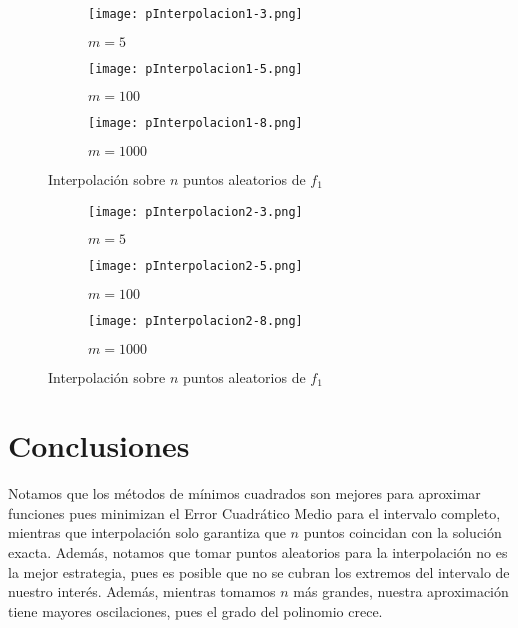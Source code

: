 \begin{figure}[H]
\centering
\begin{subfigure}[b]{0.3\textwidth}
	\centering
	\texttt{[image: pInterpolacion1-3.png]}
	\caption{$m=5$}
\end{subfigure}
\hfill
\begin{subfigure}[b]{0.3\textwidth}
	\centering
	\texttt{[image: pInterpolacion1-5.png]}
	\caption{$m=100$}
\end{subfigure}
\hfill
\begin{subfigure}[b]{0.3\textwidth}
	\centering
	\texttt{[image: pInterpolacion1-8.png]}
	\caption{$m=1000$}
\end{subfigure}
\caption{Interpolación sobre $n$ puntos aleatorios de $f_1$}
\label{fig:interpolacion1}
\end{figure}
\begin{figure}[H]
\centering
\begin{subfigure}[b]{0.3\textwidth}
	\centering
	\texttt{[image: pInterpolacion2-3.png]}
	\caption{$m=5$}
\end{subfigure}
\hfill
\begin{subfigure}[b]{0.3\textwidth}
	\centering
	\texttt{[image: pInterpolacion2-5.png]}
	\caption{$m=100$}
\end{subfigure}
\hfill
\begin{subfigure}[b]{0.3\textwidth}
	\centering
	\texttt{[image: pInterpolacion2-8.png]}
	\caption{$m=1000$}
\end{subfigure}
\caption{Interpolación sobre $n$ puntos aleatorios de $f_1$}
\label{fig:interpolacion2}
\end{figure}
\section{Conclusiones}
Notamos que los métodos de mínimos cuadrados son mejores para aproximar funciones pues minimizan el Error Cuadrático Medio para el intervalo completo, mientras que interpolación solo garantiza que $n$ puntos coincidan con la solución exacta. Además, notamos que tomar puntos aleatorios para la interpolación no es la mejor estrategia, pues es posible que no se cubran los extremos del intervalo de nuestro interés. Además, mientras tomamos $n$ más grandes, nuestra aproximación tiene mayores oscilaciones, pues el grado del polinomio crece.


